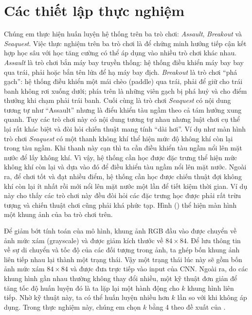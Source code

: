 \section{Các thiết lập thực nghiệm}
	Chúng em thực hiện huấn luyện hệ thống trên ba trò chơi: \textit{Assault}, \textit{Breakout} và \textit{Seaquest}.
	Việc thực nghiệm trên ba trò chơi là để chứng minh hướng tiếp cận kết hợp học sâu với học tăng cường có thể áp dụng vào nhiều trò chơi khác nhau.
	\textit{Assault} là trò chơi bắn máy bay truyền thống: hệ thống điều khiển máy bay bay qua trái, phải hoặc bắn tên lửa để hạ máy bay địch.
	\textit{Breakout} là trò chơi ``phá gạch'': hệ thống điều khiển một mái chèo (paddle) qua trái, phải để giữ cho trái banh không rơi xuống dưới; phía trên là những viên gạch bị phá huỷ và cho điểm thưởng khi chạm phải trái banh.
	Cuối cùng là trò chơi \textit{Seaquest} có nội dung tương tự như ``Assault'' nhưng là điểu khiển tàu ngầm theo cả tám hướng xung quanh.
	Tuy các trò chơi này có nội dung tương tự nhau nhưng luật chơi cụ thể lại rất khác biệt và đòi hỏi chiến thuật mang tính ``dài hơi''.
	Ví dụ như màn hình trò chơi \textit{Seaquest} có một thanh không khí thể hiện mức độ không khí còn lại trong tàu ngầm.
	Khi thanh này cạn thì ta cần điều khiển tàu ngầm nổi lên mặt nước để lấy không khí.
	Vì vậy, hệ thống cần học được đặc trưng thể hiện mức không khí còn lại và dựa vào đó để điều khiển tàu ngầm nổi lên mặt nước.
	Ngoài ra, để chơi tốt và đạt nhiều điểm, hệ thống cần học được chiến thuật đợi không khí còn lại ít nhất rồi mới nổi lên mặt nước một lần để tiết kiệm thời gian.
	Ví dụ này cho thấy các trò chơi này đều đòi hỏi các đặc trưng học được phải rất trừu tượng và chiến thuật chơi cũng phải khá phức tạp.
	Hình () thể hiện màn hình một khung ảnh của ba trò chơi trên.
	
	Để giảm bớt tính toán của mô hình, khung ảnh RGB đầu vào được chuyển về ảnh mức xám (grayscale) và được giảm kích thước về $84\times84$.
	Để lưu thông tin về sự di chuyển và tốc độ của các đối tượng trong ảnh, ta ghép bốn khung ảnh liên tiếp nhau lại thành một trạng thái.
	Vậy một trạng thái lúc này sẽ gồm bốn ảnh mức xám $84\times84$ và được đưa trực tiếp vào input của CNN.
	Ngoài ra, do các khung hình gần nhau thường không thay đổi nhiều, một kỹ thuật đơn giản để tăng tốc độ huấn luyện đó là ta lặp lại một hành động cho $k$ khung hình liên tiếp.
	Nhờ kỹ thuật này, ta có thể huấn luyện nhiều hơn $k$ lần so với khi không áp dụng.
	Trong thực nghiệm này, chúng em chọn $k$ bằng 4 theo đề xuất của \cite{mnih2013playing}.
	
